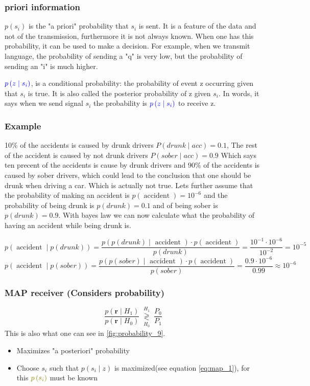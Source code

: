\subsubsection{priori information}
$p(s_i)$ is the "a priori" probability that $s_i$ is sent. It is a feature of the data and not of the transmission, furthermore it is not always known. \newline
When one has this probability, it can be used to make a decision. For example, when we transmit language, the probability of sending a "q" is very low, but the probability of sending an "i" is much higher.

$\textcolor{blue}{p\left(z \mid s_i\right)}$, is a conditional probability: the probability of event z occurring given that $s_i$ is true. It is also called the posterior probability of z given $s_i$. In words, it says when we send signal $s_i$ the probability is $\textcolor{blue}{p\left(z \mid s_i\right)}$ to receive z. 
\subsubsection{Example}
10\% of the accidents is caused by drunk drivers $P(drunk \mid acc)=0.1$, The rest of the accident is caused by not drunk drivers $P(sober \mid acc)=0.9$ Which says ten precent of the accidents is cause by drunk drivers and 90\% of the accidents is caused by sober drivers, which could lead to the conclusion that one should be drunk when driving a car. Which is actually not true. Lets further assume that the probability of making an accident is $p(\operatorname{accident})=10^{-6}$ and the probability of being drunk is $p(drunk)=0.1$ and of being sober is $p(drunk)=0.9$. With bayes law we can now calculate what the probability of having an accident while being drunk is.

$$
p\left(\operatorname{accident} \mid p(drunk)\right)=\frac{p\left(p(drunk)\mid \text { accident }\right) \cdot p(\operatorname{accident})}{p(drunk)}=\frac{10^{-1} \cdot 10^{-6}}{10^{-2}}=10^{-5}
$$
$$
p\left(\operatorname{accident} \mid p(sober)\right)=\frac{p\left(p(sober)\mid \text { accident }\right) \cdot p(\operatorname{accident})}{p(sober)}=\frac{0.9 \cdot 10^{-6}}{0.99}\approx 10^{-6}
$$

\subsubsection{MAP receiver (Considers probability)} 
$$
\frac{p\left(\boldsymbol{r} \mid H_1\right)}{p\left(\boldsymbol{r} \mid H_0\right)}\underset{\substack{H_0}}{\stackrel{H_1}{\gtrless}} \frac{P_0}{P_1}
$$
This is also what one can see in \autoref{fig:probability_9}.
\begin{itemize}
\item Maximizes "a posteriori" probability
\item Choose $s_i$ such that $p(s_i \mid z)$ is maximized(see equation \ref{eq:map_1}), for this $\textcolor{olive}{p\left(s_i\right)}$ must be known
\end{itemize}
